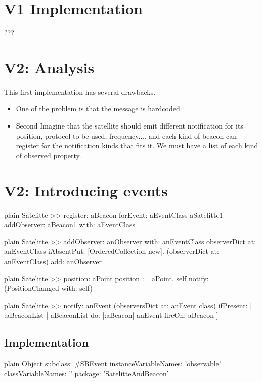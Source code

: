 \documentclass[10pt,twoside,english]{_support/latex/sbabook/sbabook}
\begin{document}
\section{V1 Implementation}
???
\section{V2: Analysis}
This first implementation has several drawbacks.

\begin{itemize}
\item One of the problem is that the message is hardcoded. 
\item Second Imagine that the satellite should emit different notification for its position, protocol to be used, frequency.... and each kind of beacon can register for the notification kinds that fits it. We must have a list of each kind of observed property.
\end{itemize}
\section{V2: Introducing events}
\begin{displaycode}{plain}
Satelitte >> register: aBeacon forEvent: aEventClass
	aSatelitte1 addObserver: aBeacon1 with: aEventClass
\end{displaycode}

\begin{displaycode}{plain}
Satelitte >> addObserver: anObserver with: anEventClass
	observerDict at: anEventClass iAbsentPut: [OrderedCollection new].
	(observerDict at: anEventClass) add: anObserver
\end{displaycode}

\begin{displaycode}{plain}
Satelitte >> position: aPoint
	position := aPoint. 
	self notify: (PositionChanged with: self)
\end{displaycode}

\begin{displaycode}{plain}
Satelitte >> notify: anEvent
	(observersDict at: anEvent class) ifPresent: [ :aBeaconList | 
		aBeaconList do: [:aBeacon| anEvent fireOn: aBeacon ]
\end{displaycode}
\subsection{Implementation}
\begin{displaycode}{plain}
Object subclass: #SBEvent
	instanceVariableNames: 'observable'
	classVariableNames: ''
	package: 'SatelitteAndBeacon'
\end{displaycode}
\end{document}
